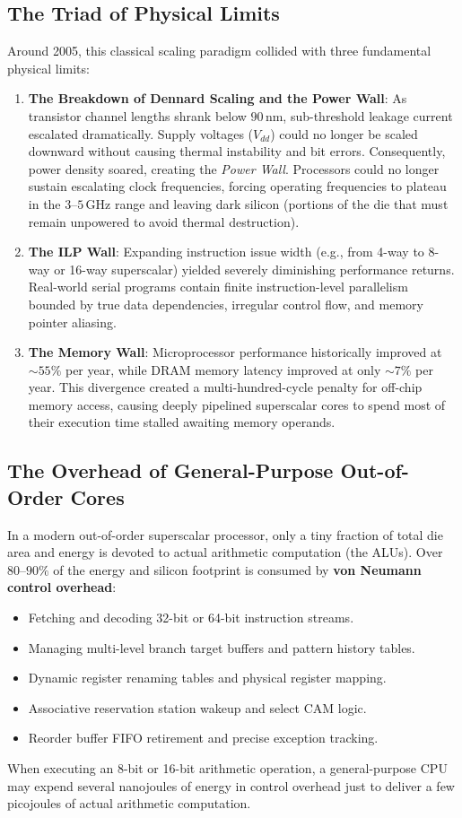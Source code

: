 \subsection{The Triad of Physical Limits}
Around 2005, this classical scaling paradigm collided with three fundamental physical limits:
\begin{enumerate}
    \item \textbf{The Breakdown of Dennard Scaling and the Power Wall}: As transistor channel lengths shrank below $90\,\text{nm}$, sub-threshold leakage current escalated dramatically. Supply voltages ($V_{dd}$) could no longer be scaled downward without causing thermal instability and bit errors. Consequently, power density soared, creating the \emph{Power Wall}. Processors could no longer sustain escalating clock frequencies, forcing operating frequencies to plateau in the $3\text{--}5\,\text{GHz}$ range and leaving dark silicon (portions of the die that must remain unpowered to avoid thermal destruction).
    \item \textbf{The ILP Wall}: Expanding instruction issue width (e.g., from 4-way to 8-way or 16-way superscalar) yielded severely diminishing performance returns. Real-world serial programs contain finite instruction-level parallelism bounded by true data dependencies, irregular control flow, and memory pointer aliasing.
    \item \textbf{The Memory Wall}: Microprocessor performance historically improved at $\sim 55\%$ per year, while DRAM memory latency improved at only $\sim 7\%$ per year. This divergence created a multi-hundred-cycle penalty for off-chip memory access, causing deeply pipelined superscalar cores to spend most of their execution time stalled awaiting memory operands.
\end{enumerate}

\subsection{The Overhead of General-Purpose Out-of-Order Cores}
In a modern out-of-order superscalar processor, only a tiny fraction of total die area and energy is devoted to actual arithmetic computation (the ALUs). Over $80\text{--}90\%$ of the energy and silicon footprint is consumed by \textbf{von Neumann control overhead}:
\begin{itemize}
    \item Fetching and decoding 32-bit or 64-bit instruction streams.
    \item Managing multi-level branch target buffers and pattern history tables.
    \item Dynamic register renaming tables and physical register mapping.
    \item Associative reservation station wakeup and select CAM logic.
    \item Reorder buffer FIFO retirement and precise exception tracking.
\end{itemize}
When executing an 8-bit or 16-bit arithmetic operation, a general-purpose CPU may expend several nanojoules of energy in control overhead just to deliver a few picojoules of actual arithmetic computation.

